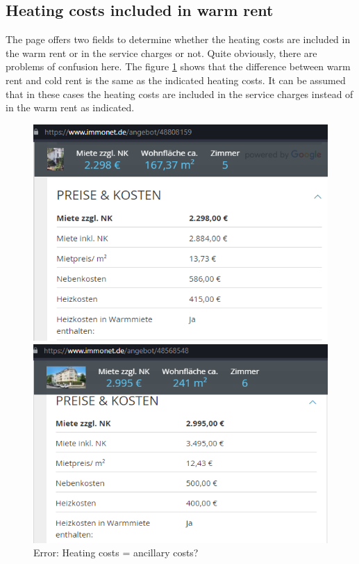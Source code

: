 \subsection{Heating costs included in warm rent}
The page offers two fields to determine whether the heating costs are included in the warm rent or in the service charges or not. Quite obviously, there are problems of confusion here. The figure \ref{Error: Heizkosten in Warmmiete} shows that the difference between warm rent and cold rent is the same as the indicated heating costs. It can be assumed that in these cases the heating costs are included in the service charges instead of in the warm rent as indicated.
\begin{figure}[H]
	\begin{center}
		\begin{minipage}{0.4\textwidth}
			\includegraphics[width=0.7\linewidth]{img/48808159}
		\end{minipage}
		\begin{minipage}{0.4\textwidth}
			\includegraphics[width=0.7\linewidth]{img/48568548  }
		\end{minipage}
	\end{center}
	\caption{Error: Heating costs = ancillary costs?  }	
	\label{Error: Heizkosten in Warmmiete}
\end{figure}

